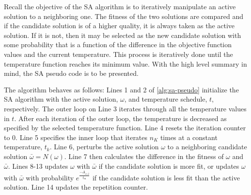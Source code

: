 \documentclass[11pt,a4paper,final]{article}
\begin{document}
Recall the objective of the SA algorithm is to iteratively manipulate an active solution to a neighboring one. The
fitness of the two solutions are compared and if the candidate solution is of a higher quality, it is always taken as
the active solution. If it is not, then it may be selected as the new candidate solution with some probability that is a
function of the difference in the objective function values and the current temperature. This process is iteratively
done until the temperature function reaches its minimum value. With the high level summary in mind, the SA pseudo code
is to be presented.

The algorithm behaves as follows: Lines 1 and 2 of \ref{alg:sa-pseudo} initialize the SA algorithm with the active
solution, \(\omega\), and temperature schedule, \(t\), respectively. The outer loop on Line 3 iterates through all the
temperature values in \(t\). After each iteration of the outer loop, the temperature is decreased as specified by the
selected temperature function. Line 4 resets the iteration counter to 0. Line 5 specifies the inner loop that iterates
\(n_K\) times at a constant temperature, \(t_k\). Line 6, perturbs the active solution \(\omega\) to a neighboring candidate
solution \(\bar{\omega} = N(\omega)\). Line 7 then calculates the difference in the fitness of \(\omega\) and \(\bar{\omega}\). Lines 8-13 updates
\(\omega\) with \(\bar{\omega}\) if the candidate solution is more fit, or updates \(\omega\) with \(\bar{\omega}\) with probability \(e^{\frac{-\Delta_{\omega
, \bar{\omega}}}{t_m}}\) if the candidate solution is less fit than the active solution. Line 14 updates the repetition
counter.
\end{document}
